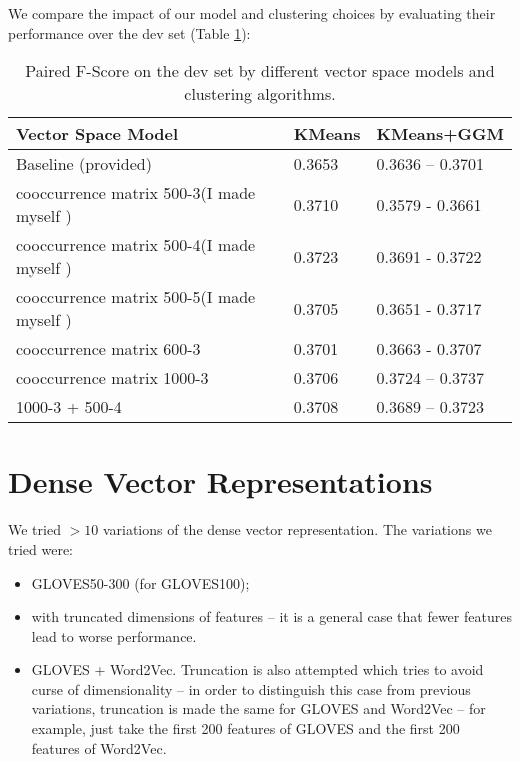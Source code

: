 \documentclass[12pt]{article}
\begin{document}
We compare the impact of our model and clustering choices by evaluating their performance over the dev set (Table \ref{tab:sparseresults}):

\begin{table}[]
\centering
\begin{tabular}{|l|l|l|} \hline
Vector Space Model  & KMeans & KMeans+GGM  \\ \hline
Baseline (provided) &   0.3653     &      0.3636 -- 0.3701          \\ \hline
cooccurrence matrix 500-3(I made myself )   &  0.3710    &            0.3579  - 0.3661           \\ \hline
cooccurrence matrix 500-4(I made myself )   &  0.3723    &     0.3691 -   0.3722                \\ \hline
cooccurrence matrix 500-5(I made myself )   &  0.3705    &        0.3651 - 0.3717           \\ \hline
cooccurrence matrix 600-3  &    0.3701    &       0.3663 - 0.3707              \\ \hline
cooccurrence matrix 1000-3  &    0.3706    &     0.3724 --   0.3737           \\ \hline
1000-3 + 500-4 & 0.3708  & 0.3689 -- 0.3723 \\ \hline
\end{tabular}
\caption{Paired F-Score on the dev set by different vector space models and clustering algorithms.}
\label{tab:sparseresults}
\end{table}

\section{Dense Vector Representations}

We tried $>10$ variations of the dense vector representation. The variations we tried were:

\begin{itemize}
\item GLOVES50-300 (for GLOVES100);
\item  with truncated dimensions of features  -- it is a general case that fewer features lead to worse performance.
\item GLOVES + Word2Vec. Truncation is also attempted which tries to avoid curse of dimensionality -- in order to distinguish this case from previous variations, truncation is made the same for GLOVES and Word2Vec -- for example, just take the first 200 features of GLOVES and the first 200 features of Word2Vec.
\end{itemize}
\end{document}
